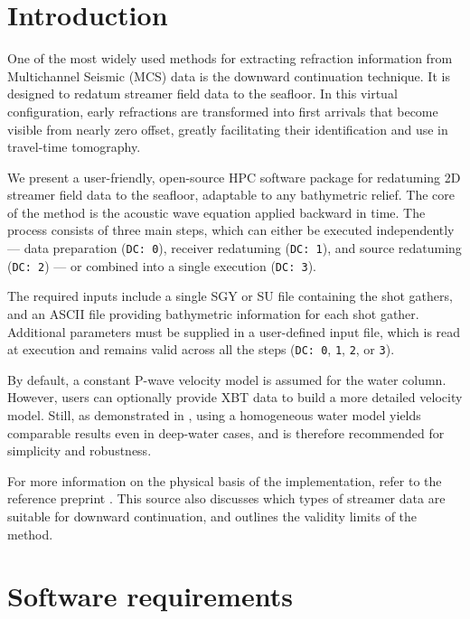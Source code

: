 \documentclass[11pt, oneside]{article}   	%
\begin{document}
\newpage

\section{Introduction}


One of the most widely used methods for extracting refraction information from Multichannel Seismic (MCS) data is the downward continuation technique. It is designed to redatum streamer field data to the seafloor. In this virtual configuration, early refractions are transformed into first arrivals that become visible from nearly zero offset, greatly facilitating their identification and use in travel-time tomography.

We present a user-friendly, open-source HPC software package for redatuming 2D streamer field data to the seafloor, adaptable to any bathymetric relief. The core of the method is the acoustic wave equation applied backward in time. The process consists of three main steps, which can either be executed independently — data preparation (\texttt{DC: 0}), receiver redatuming (\texttt{DC: 1}), and source redatuming (\texttt{DC: 2}) — or combined into a single execution (\texttt{DC: 3}).

The required inputs include a single SGY or SU file containing the shot gathers, and an ASCII file providing bathymetric information for each shot gather. Additional parameters must be supplied in a user-defined input file, which is read at execution and remains valid across all the steps (\texttt{DC: 0}, \texttt{1}, \texttt{2}, or \texttt{3}).

By default, a constant P-wave velocity model is assumed for the water column. However, users can optionally provide XBT data to build a more detailed velocity model. Still, as demonstrated in \cite{estela}, using a homogeneous water model yields comparable results even in deep-water cases, and is therefore recommended for simplicity and robustness.

For more information on the physical basis of the implementation, refer to the reference preprint \cite{estela}. This source also discusses which types of streamer data are suitable for downward continuation, and outlines the validity limits of the method.




\section{Software requirements}\label{sec1}
\end{document}
